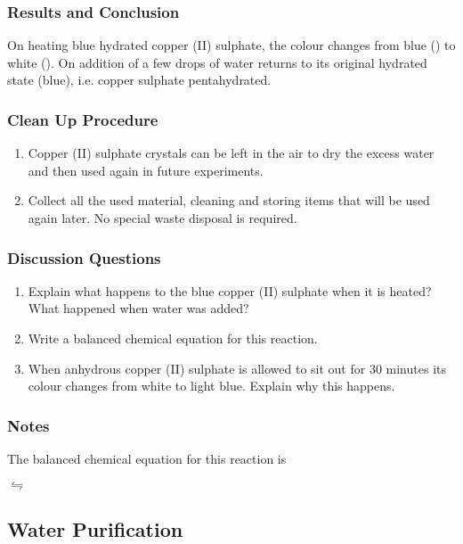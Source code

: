 \subsubsection*{Results and Conclusion}
On heating blue hydrated copper (II) sulphate, the colour changes from blue () to white (). On addition of a few drops of water  returns to its original hydrated state (blue), i.e. copper sulphate pentahydrated.

\subsubsection*{Clean Up Procedure}
\begin{enumerate}
\item{Copper (II) sulphate crystals can be left in the air to dry the excess water and then used again in future experiments.}
\item{Collect all the used material, cleaning and storing items that will be used again later. No special waste disposal is required.}
\end{enumerate}

\subsubsection*{Discussion Questions}
\begin{enumerate}
\item{Explain what happens to the blue copper (II) sulphate when it is heated? What happened when water was added?}
\item{Write a balanced chemical equation for this reaction.}
\item{When anhydrous copper (II) sulphate is allowed to sit out for 30 minutes its colour changes from white to light blue. Explain why this happens.}
\end{enumerate}

\subsubsection*{Notes}
The balanced chemical equation for this reaction is 
\begin{center}
$\leftrightharpoons$ 
\end{center}

\subsection{Water Purification}

